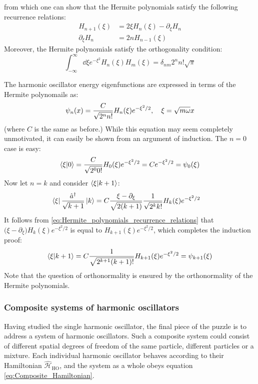 \documentclass[nofootinbib,reprint,english]{revtex4-1}
\newcommand{\hatHH}{\hat{\mathcal{H}}}
\begin{document}
from which one can show that the Hermite polynomials satisfy the following recurrence relations:
\begin{subequations}\label{eq:Hermite_polynomials_recurrence_relations}
\begin{align}
H_{n+1}(\xi)&=2\xi H_n(\xi)-\partial_\xi H_n\\
\partial_\xi H_n&=2nH_{n-1}(\xi)
\end{align}
\end{subequations}
Moreover, the Hermite polynomials satisfy the orthogonality condition:
\begin{equation}\label{eq:Hermite_polynomials_orthogonality}
\int_{-\infty}^{\infty}\dd{\xi}e^{-\xi^2}H_n(\xi)H_m(\xi)=\delta_{nm}2^nn!\sqrt{\pi}
\end{equation}

The harmonic oscillator energy eigenfunctions are expressed in terms of the Hermite polynomails as:
\begin{equation}\label{eq:harmonic_oscillator_energy_eigenfunctions}
\psi_n(x)=\frac{C}{\sqrt{2^nn!}}H_n(\xi)e^{-\xi^2/2}\qcomma\xi=\sqrt{m\omega}x
\end{equation}
(where \(C\) is the same as before.) While this equation may seem completely unmotivated, it can easily be shown from an argument of induction. The \(n=0\) case is easy:
\[\braket{\xi}{0}=\frac{C}{\sqrt{2^00!}}H_0(\xi)e^{-\xi^2/2}=Ce^{-\xi^2/2}=\psi_0(\xi)\]
Now let \(n=k\) and consider \(\braket{\xi}{k+1}\):
\begin{align*}
\bra{\xi}\frac{\hat{a}^\dagger}{\sqrt{k+1}}\ket{k}&=C\frac{\xi-\partial_\xi}{\sqrt{2(k+1)}}\frac{1}{\sqrt{2^kk!}}H_k(\xi)e^{-\xi^2/2}
\end{align*}
It follows from \eqref{eq:Hermite_polynomials_recurrence_relations} that \(\big(\xi-\partial_\xi\big)H_k(\xi)e^{-\xi^2/2}\) is equal to \(H_{k+1}(\xi)e^{-\xi^2/2}\), which completes the induction proof:
\[\braket{\xi}{k+1}=C\frac{1}{\sqrt{2^{k+1}(k+1)!}}H_{k+1}(\xi)e^{-\xi^2/2}=\psi_{k+1}(\xi)\]
Note that the question of orthonormality is ensured by the orthonormality of the Hermite polynomials.
\subsubsection{Composite systems of harmonic oscillators}
Having studied the single harmonic oscillator, the final piece of the puzzle is to address a system of harmonic oscillators. Such a composite system could consist of different spatial degrees of freedom of the same particle, different particles or a mixture. Each individual harmonic oscillator behaves according to their Hamiltonian \(\hatHH_\text{HO}\), and the system as a whole obeys equation \eqref{eq:Composite_Hamiltonian}.
\end{document}
